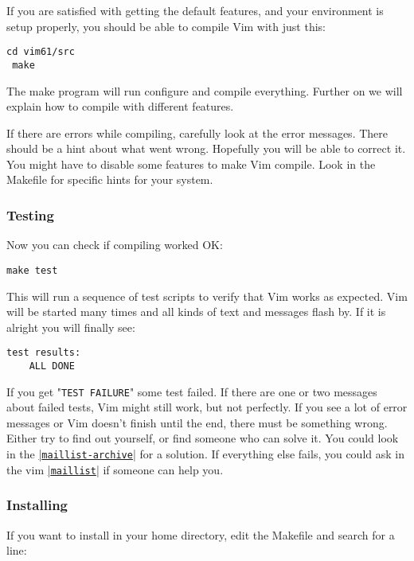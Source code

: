 If you are satisfied with getting the default features, and your environment is setup properly, you should be able to compile Vim with just this:

\begin{Verbatim}[samepage=true]
 cd vim61/src
 make
\end{Verbatim}

The make program will run configure and compile everything.
Further on we will explain how to compile with different features.

If there are errors while compiling, carefully look at the error messages.
There should be a hint about what went wrong.
Hopefully you will be able to correct it.
You might have to disable some features to make Vim compile.
Look in the Makefile for specific hints for your system.

\subsubsection{Testing}
Now you can check if compiling worked OK:

\begin{Verbatim}[samepage=true]
 make test
\end{Verbatim}

This will run a sequence of test scripts to verify that Vim works as expected.
Vim will be started many times and all kinds of text and messages flash by.
If it is alright you will finally see:

\begin{Verbatim}[samepage=true]
    test results: 
    ALL DONE 
\end{Verbatim}

If you get "\verb!TEST FAILURE!" some test failed.
If there are one or two messages about failed tests, Vim might still work, but not perfectly.
If you see a lot of error messages or Vim doesn't finish until the end, there must be something wrong.
Either try to find out yourself, or find someone who can solve it.
You could look in the \hyperref[maillist-archive]{|\texttt{maillist-archive}|} for a solution.
If everything else fails, you could ask in the vim \hyperref[maillist]{|\texttt{maillist}|} if someone can help you.

\subsubsection{Installing}
\label{install-home}
If you want to install in your home directory, edit the Makefile and search for a line:

